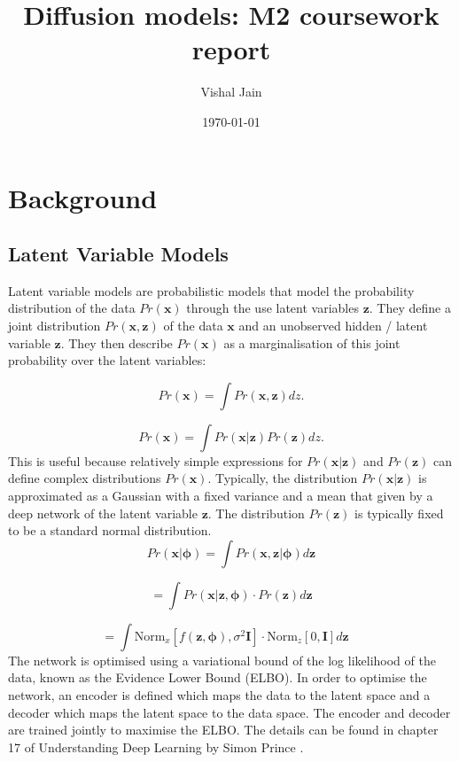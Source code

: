 \documentclass[11pt]{article}
\title{Diffusion models: M2 coursework report}
\author{Vishal Jain}
\date{\today}
\begin{document}
\maketitle

\tableofcontents

\newpage
\section{Background}
\subsection{Latent Variable Models}
Latent variable models are probabilistic models that model the probability distribution of the data $Pr(\mathbf{x})$ through the use latent variables $\mathbf{z}$. They define a joint distribution $Pr(\mathbf{x}, \mathbf{z})$ of the data $\mathbf{x}$ and an unobserved hidden / latent variable $\mathbf{z}$. They then describe $Pr(\mathbf{x})$ as a marginalisation of this joint probability over the latent variables:

$$
Pr(\mathbf{x}) = \int Pr(\mathbf{x}, \mathbf{z})dz.
$$

$$
Pr(\mathbf{x}) = \int Pr(\mathbf{x}|\mathbf{z}) Pr(\mathbf{z})dz.
$$
This is useful because relatively simple expressions for $Pr(\mathbf{x}|\mathbf{z})$ and $Pr(\mathbf{z})$ can define complex distributions $Pr(\mathbf{x})$. Typically, the distribution $Pr(\mathbf{x}|\mathbf{z})$ is approximated as a Gaussian with a fixed variance and a mean that given by a deep network of the latent variable $\mathbf{z}$. The distribution $Pr(\mathbf{z})$ is typically fixed to be a standard normal distribution.
$$
Pr(\mathbf{x}|\boldsymbol{\phi}) = \int Pr(\mathbf{x}, \mathbf{z}|\boldsymbol{\phi}) d\mathbf{z}
$$

$$
= \int Pr(\mathbf{x}|\mathbf{z}, \boldsymbol{\phi}) \cdot Pr(\mathbf{z}) d\mathbf{z}
$$

$$
= \int \text{Norm}_x [f(\mathbf{z}, \boldsymbol{\phi}), \sigma^2 \mathbf{I}] \cdot \text{Norm}_z [0, \mathbf{I}] d\mathbf{z} \quad
$$
The network is optimised using a variational bound of the log likelihood of the data, known as the Evidence Lower Bound (ELBO). In order to optimise the network, an encoder is defined which maps the data to the latent space and a decoder which maps the latent space to the data space. The encoder and decoder are trained jointly to maximise the ELBO. The details can be found in chapter 17 of Understanding Deep Learning by Simon Prince \cite{prince}.
\end{document}
